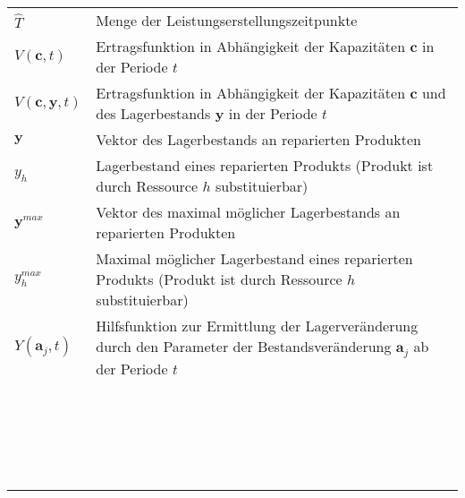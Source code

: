 \documentclass[a4paper,12pt,normalheadings,footexclude,headinclude,liststotoc,nochapterprefix,onecolumn,oneside,parskip,pointlessnumbers]{scrreprt}
\begin{document}
\begin{table}[t!]
    \vspace*{-3mm}
    \hspace*{2mm}
  \renewcommand{\arraystretch}{1,5}
  \begin{flushleft}
    \begin{tabular}{lp{11.5cm}}  %
        $\hat T$ & Menge der Leistungserstellungszeitpunkte\\
   $V(\textbf{c},t)$ & Ertragsfunktion in Abhängigkeit der Kapazitäten $\textbf{c}$ in der Periode $t$\\
      $V(\textbf{c},\textbf{y},t)$ & Ertragsfunktion in Abhängigkeit der Kapazitäten $\textbf{c}$ und des Lagerbestands $\textbf{y}$ in der Periode $t$\\
            $\textbf{y}$ & Vektor des Lagerbestands an reparierten Produkten\\
      $y_h$ & Lagerbestand eines reparierten Produkts (Produkt ist durch Ressource $h$ substituierbar) \\
        $\textbf{y}^{max}$ & Vektor des maximal möglicher Lagerbestands an reparierten Produkten \\
            $y^{max}_h$ & Maximal möglicher Lagerbestand eines reparierten Produkts (Produkt ist durch Ressource $h$ substituierbar) \\
                      $Y(\textbf{a}_{j},t)$ & Hilfsfunktion zur Ermittlung der Lagerveränderung durch den Parameter der Bestandsveränderung $\textbf{a}_{j}$ ab der Periode $t$\\
                                  \\
            \\
            \\
            \\
            \\
            \\
                                              \\
            \\
            \\
            \\
            \\
            \\
                        \\
            \\
                                              \\
            \\
            \\
            \\
            \\
            \\
	\end{tabular}
	\end{flushleft}
\end{table}
\end{document}
